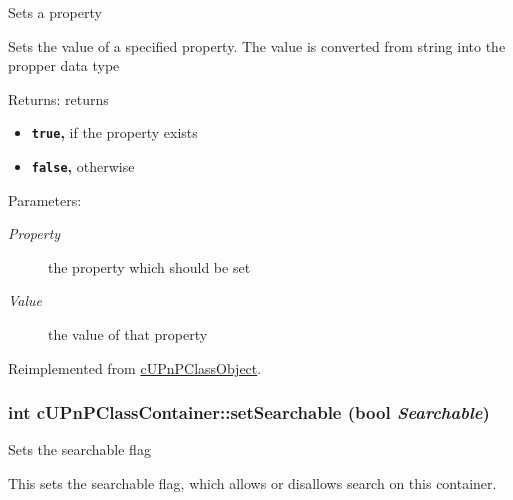 Sets a property

Sets the value of a specified property. The value is converted from string into the propper data type

\begin{Desc}
\item[Returns:]returns\begin{itemize}
\item {\bf {\tt true},} if the property exists\item {\bf {\tt false},} otherwise \end{itemize}
\end{Desc}
\begin{Desc}
\item[Parameters:]
\begin{description}
\item[{\em Property}]the property which should be set \item[{\em Value}]the value of that property \end{description}
\end{Desc}


Reimplemented from \hyperlink{classcUPnPClassObject_6f2a803a0d0e148133edce23ed6c0e7c}{cUPnPClassObject}.\hypertarget{classcUPnPClassContainer_d32e937984f39806a15a22d13a644703}{
\subsubsection[{setSearchable}]{\setlength{\rightskip}{0pt plus 5cm}int cUPnPClassContainer::setSearchable (bool {\em Searchable})}}
\label{classcUPnPClassContainer_d32e937984f39806a15a22d13a644703}


Sets the searchable flag

This sets the searchable flag, which allows or disallows search on this container.

